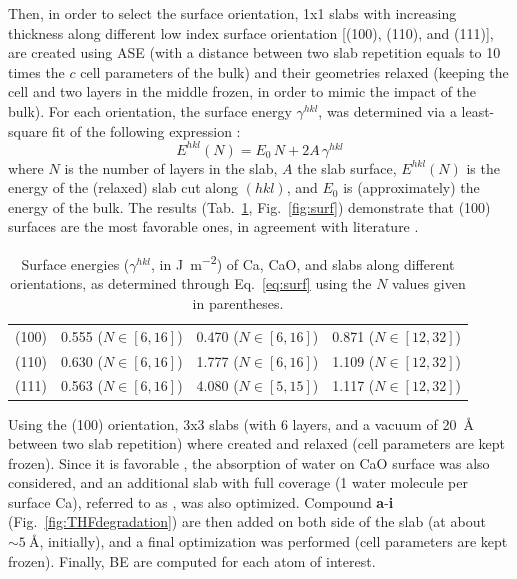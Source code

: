 \documentclass[12pt,a4paper]{article}
\begin{document}
Then, in order to select the surface orientation, 1x1 slabs with increasing thickness along different low index surface orientation [(100), (110), and (111)], are created using ASE \cite{larsenAtomicSimulationEnvironment2017} (with a distance between two slab repetition equals to 10 times the $c$ cell parameters of the bulk) and their geometries relaxed (keeping the cell and two layers in the middle frozen, in order to mimic the impact of the bulk). For each orientation, the surface energy $\gamma^{hkl}$, was determined via a least-square fit of the following expression \cite{sunEfficientCreationConvergence2013,tranSurfaceEnergiesElemental2016}:\begin{equation}
E^{hkl}(N) = E_0\,N +	2A\,\gamma^{hkl} \label{eq:surf}
\end{equation}
where $N$ is the number of layers in the slab,  $A$ the slab surface, $E^{hkl}(N)$ is the energy of the (relaxed) slab cut along $(hkl)$, and $E_0$ is (approximately) the energy of the bulk. The results (Tab.~\ref{tab:surf}, Fig.~\ref{fig:surf}) demonstrate that (100) surfaces are the most favorable ones, in agreement with literature \cite{deleeuwDensityFunctionalTheory2000,ebadiInsightsLiMetalOrganic2019}.

\begin{table}[!h]
	\centering
	\begin{tabular}{lccc}
		\toprule
		&	\ce{Ca} & \ce{CaO} &	\ce{CaH2} \\
		\midrule
		(100) & 0.555 ($N\in[6,16]$) & 0.470 ($N\in[6,16]$) & 0.871  ($N\in[12,32]$)\\
		(110) & 0.630  ($N\in[6,16]$)& 1.777  ($N\in[6,16]$)& 1.109 ($N\in[12,32]$)\\
		(111) & 0.563  ($N\in[6,16]$) & 4.080  ($N\in[5,15]$)  & 1.117   ($N\in[12,32]$) \\ 
		\bottomrule
	\end{tabular}
	\caption{Surface energies ($\gamma^{hkl}$, in \si{\joule\per\meter\squared}) of Ca, CaO, and  slabs along different orientations, as determined through Eq.~\eqref{eq:surf} using the $N$ values given in parentheses.}
	\label{tab:surf}
\end{table}

Using the (100) orientation, 3x3 slabs (with 6 layers, and a vacuum of \SI{20}{\angstrom} between two slab repetition) where created and relaxed (cell parameters are kept frozen).  Since it is favorable \cite{deleeuwDensityFunctionalTheory2000}, the absorption of water on CaO surface was also considered, and an additional slab with full coverage (1 water molecule per surface Ca), referred to as , was also optimized. Compound \textbf{a}-\textbf{i} (Fig.~\ref{fig:THFdegradation}) are then added on both side of the slab (at about $\sim\SI{5}{\angstrom}$, initially), and a final optimization was performed (cell parameters are kept frozen). Finally, BE are computed for each atom of interest.
\end{document}
